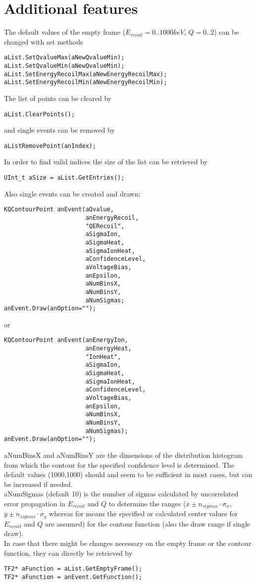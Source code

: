 \documentclass[10pt, a4paper]{article}
\begin{document}
\section{Additional features}

The default values of the empty frame ($E_{recoil} = 0..1000 keV$, $Q = 0..2$) can be changed with set methods
\begin{verbatim}
aList.SetQvalueMax(aNewQvalueMin);
aList.SetQvalueMin(aNewQvalueMin);
aList.SetEnergyRecoilMax(aNewEnergyRecoilMax);
aList.SetEnergyRecoilMin(aNewEnergyRecoilMin);
\end{verbatim}

The list of points can be cleared by
\begin{verbatim}
aList.ClearPoints();
\end{verbatim}
and single events can be removed by
\begin{verbatim}
aListRemovePoint(anIndex);
\end{verbatim}
In order to find valid indices the size of the list can be retrieved by
\begin{verbatim}
UInt_t aSize = aList.GetEntries();
\end{verbatim}

Also single events can be created and drawn:
\begin{verbatim}
KQContourPoint anEvent(aQvalue,
                       anEnergyRecoil,
                       "QERecoil",
                       aSigmaIon,
                       aSigmaHeat,
                       aSigmaIonHeat,
                       aConfidenceLevel,
                       aVoltageBias,
                       anEpsilon,
                       aNumBinsX,
                       aNumBinsY,
                       aNumSigmas;
anEvent.Draw(anOption="");
\end{verbatim}
or
\begin{verbatim}
KQContourPoint anEvent(anEnergyIon,
                       anEnergyHeat,
                       "IonHeat",
                       aSigmaIon,
                       aSigmaHeat,
                       aSigmaIonHeat,
                       aConfidenceLevel,
                       aVoltageBias,
                       anEpsilon,
                       aNumBinsX,
                       aNumBinsY,
                       aNumSigmas);
anEvent.Draw(anOption="");
\end{verbatim}
aNumBinsX and aNumBinsY are the dimensions of the distribution histogram from which the contour for the specified confidence level is determined.
The default values (1000,1000) should and seem to be sufficient in most cases, but can be increased if needed. \\
aNumSigmas (default 10) is the number of sigmas calculated by uncorrelated error propagation in $E_{recoil}$ and $Q$ to determine the ranges ($\overline{x} \pm n_{sigmas} \cdot \sigma_{x}$,$\overline{y} \pm n_{sigmas} \cdot \sigma_{y}$  whereas for means the specified or calculated center values for $E_{recoil}$ and $Q$ are assumed)  for the contour function (also the draw range if single draw). \\[0.5cm]

In case that there might be changes necessary on the empty frame or the contour function, they can directly be retrieved by
\begin{verbatim}
TF2* aFunction = aList.GetEmptyFrame();
TF2* aFunction = anEvent.GetFunction();
\end{verbatim}
\end{document}
